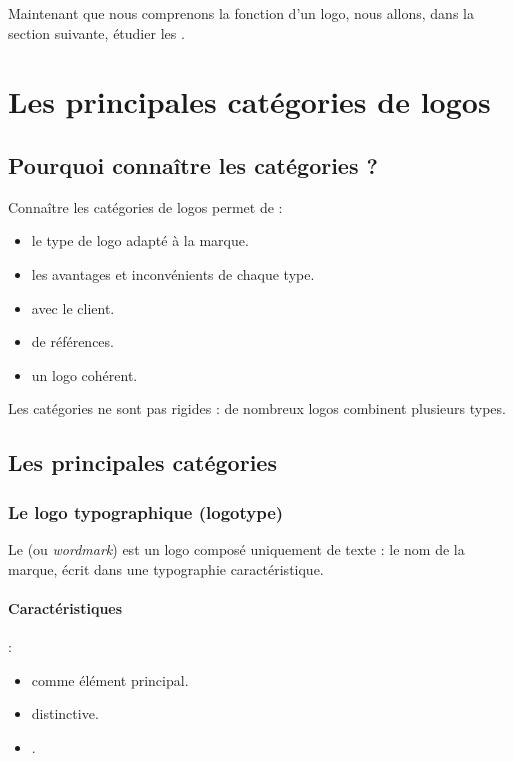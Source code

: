Maintenant que nous comprenons la fonction d'un logo, nous allons, dans la section suivante, étudier les .

\section{Les principales catégories de logos}

\subsection{Pourquoi connaître les catégories ?}

Connaître les catégories de logos permet de :

\begin{itemize}
    \item {} le type de logo adapté à la marque.
    \item {} les avantages et inconvénients de chaque type.
    \item {} avec le client.
    \item {} de références.
    \item {} un logo cohérent.
\end{itemize}

Les catégories ne sont pas rigides : de nombreux logos combinent plusieurs types.

\subsection{Les principales catégories}

\subsubsection{Le logo typographique (logotype)}

Le  (ou \emph{wordmark}) est un logo composé uniquement de texte : le nom de la marque, écrit dans une typographie caractéristique.

\paragraph{Caractéristiques} :
\begin{itemize}
    \item {} comme élément principal.
    \item {} distinctive.
    \item {}.
\end{itemize}

